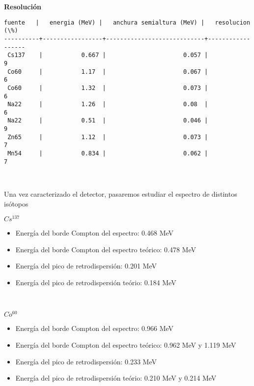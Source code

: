 \documentclass[11pt]{article}
\begin{document}
    \textbf{Resolución}

    \begin{Verbatim}[commandchars=\\\{\}]
 fuente   |   energia (MeV) |   anchura semialtura (MeV) |   resolucion (\%)
----------+-----------------+----------------------------+------------------
 Cs137    |           0.667 |                      0.057 |                9
 Co60     |           1.17  |                      0.067 |                6
 Co60     |           1.32  |                      0.073 |                6
 Na22     |           1.26  |                      0.08  |                6
 Na22     |           0.51  |                      0.046 |                9
 Zn65     |           1.12  |                      0.073 |                7
 Mn54     |           0.834 |                      0.062 |                7
    \end{Verbatim}

    \begin{center}
    \end{center}
    { \hspace*{\fill} \\}
    
    Una vez caracterizado el detector, pasaremos estudiar el espectro de
distintos isótopos

    \(Cs^{137}\)

\begin{itemize}
\item
  Energía del borde Compton del espectro: 0.468 MeV
\item
  Energía del borde Compton del espectro teórico: 0.478 MeV
\item
  Energía del pico de retrodispersión: 0.201 MeV
\item
  Energía del pico de retrodispersión teório: 0.184 MeV
\end{itemize}

    \begin{center}
    \end{center}
    { \hspace*{\fill} \\}
    
    \(Co^{60}\)

\begin{itemize}
\item
  Energía del borde Compton del espectro: 0.966 MeV
\item
  Energía del borde Compton del espectro teórico: 0.962 MeV y 1.119 MeV
\item
  Energía del pico de retrodispersión: 0.233 MeV
\item
  Energía del pico de retrodispersión teório: 0.210 MeV y 0.214 MeV
\end{itemize}
\end{document}
